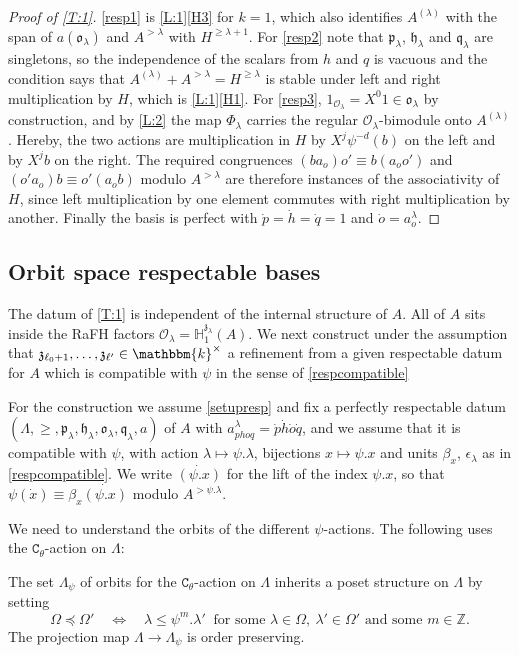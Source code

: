 \documentclass[a4paper,11pt]{amsart}
\numberwithin{equation}{subsection}
\theoremstyle{definition}
\theoremstyle{theorem}
\theoremstyle{remark}
\newcommand\CO{\mathcal{O}}
\newcommand\kapp{{\mathfrak{z}}}
\newcommand\plam[1][\lambda]{\mathfrak{p}_{#1}}
\newcommand\hlam[1][\lambda]{\mathfrak{h}_{#1}}
\newcommand\qlam[1][\lambda]{\mathfrak{q}_{#1}}
\newcommand\Olam[1][\lambda]{\CO_{#1}}
\newcommand\olam[1][\lambda]{\mathfrak{o}_{#1}}
\newcommand\HH{\mathbb{H}}
\newcommand\kk{\mathbbm{k}}
\newcommand\Z{\mathbb{Z}}
\begin{document}
\begin{proof}[Proof of \autoref{T:1}]
  \autoref{resp1} is
  \autoref{L:1}\autoref{H3} for $k=1$, which also identifies
  $A^{(\lambda)}$ with the span of $a(\olam)$ and $A^{>\lambda}$ with
  $H^{\ge\lambda+1}$.  For \autoref{resp2} note that $\plam$,
  $\hlam$ and $\qlam$ are singletons, so the independence of the scalars
  from $h$ and $q$ is vacuous and the condition says that $A^{(\lambda)}+A^{>\lambda}=H^{\ge\lambda}$
  is stable under left and right multiplication by $H$,
  which is \autoref{L:1}\autoref{H1}.  For \autoref{resp3},
  $1_{\Olam}=X^{0}1\in\olam$ by construction, and by \autoref{L:2} the map
  $\Phi_\lambda$ carries the regular $\Olam$-bimodule onto $A^{(\lambda)}$. Hereby,
  the two actions are multiplication in $H$ by
  $X^{j}\psi^{-d}(b)$ on the left and by $X^{j}b$ on the right.  The required
  congruences $(ba_{o})o'\equiv b(a_{o}o')$ and $(o'a_{o})b\equiv o'(a_{o}b)$
  modulo $A^{>\lambda}$ are therefore instances of the associativity of
  $H$, since left multiplication by one element commutes
  with right multiplication by another.  Finally the basis is perfect with
  $\dot p=\dot h=\dot q=1$ and $\dot o=a^{\lambda}_{o}$.
\end{proof}
\subsection{Orbit space respectable bases}
The datum of \autoref{T:1} is independent of the internal structure of  $A$. All of $A$ sits inside the RaFH factors $\Olam=\HH^{\kapp_\lambda}_1(A)$.
We next construct under the assumption that $\kapp_{\ell_0+1},\dots,\kapp_{\ell'}\in\kk^\times$  a refinement from a given respectable datum for $A$ which is compatible with $\psi$ in the sense of  \autoref{respcompatible}

For the construction we assume \autoref{setupresp} and  fix a perfectly respectable datum
$(\Lambda,\ge,\plam,\hlam,\olam,\qlam,a)$ of $A$ with
$a^\lambda_{phoq}=\dot p\dot h\dot o\dot q$, and we assume that it is
compatible with $\psi$, with action $\lambda\mapsto\psi.\lambda$,
bijections $x\mapsto\psi.x$ and units $\beta_x$, $\epsilon_\lambda$ as
in \autoref{respcompatible}. We write $\dot{(\psi.x)}$ for the lift of
the index $\psi.x$, so that $\psi(\dot x)\equiv\beta_x\dot{(\psi.x)}$
modulo $A^{>\psi.\lambda}$.

We need to understand the orbits of the different $\psi$-actions. The following uses the  $\mathtt{C}_\theta$-action on $\Lambda$:
\begin{Lemma}
The set $\Lambda_\psi$ of orbits for the  $\mathtt{C}_\theta$-action on $\Lambda$ inherits a  poset structure on $\Lambda$ by setting
\[
  \Omega\preceq\Omega'\quad\Longleftrightarrow\quad
  \lambda\le\psi^{m}.\lambda'\ \text{ for some }\lambda\in\Omega,\
  \lambda'\in\Omega'\text{ and some }m\in\Z .
\]
The projection map
$\Lambda\to\Lambda_\psi$ is order preserving.
\end{Lemma}
\end{document}
